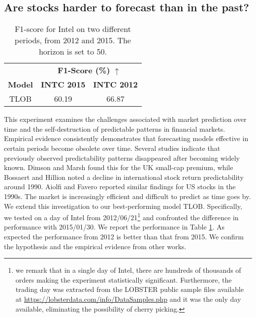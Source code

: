 \subsection{Are stocks harder to forecast than in the past?}
\begin{table}[h!]
\centering
\begin{minipage}{0.48\textwidth}
\centering
\caption{F1-score for Intel on two different periods, from 2012 and 2015. The horizon is set to 50.} 
\label{tab:intel2}
\centering
        \begin{tabular}{c|cc}
            \toprule
            & \multicolumn{2}{c}{\textbf{F1-Score (\%) }$\uparrow$} \\
            \cmidrule(lr){2-3} 
            \textbf{Model} & \textbf{INTC 2015} & \textbf{INTC 2012} \\
            \midrule
            TLOB & 60.19 & 66.87 \\
            \bottomrule
        \end{tabular}
        \end{minipage}
\end{table}
\label{sec:past}
This experiment examines the challenges associated with market prediction over time and the self-destruction of predictable patterns in financial markets. Empirical evidence consistently demonstrates that forecasting models effective in certain periods become obsolete over time. Several studies indicate that previously observed predictability patterns disappeared after becoming widely known. Dimson and Marsh \cite{dimson1999murphy} found this for the UK small-cap premium, while Bossaert and Hillion \cite{bossaerts1999implementing} noted a decline in international stock return predictability around 1990. Aiolfi and Favero \cite{aiolfi2005model} reported similar findings for US stocks in the 1990s. The market is increasingly efficient and difficult to predict as time goes by. We extend this investigation to our best-performing model TLOB. Specifically, we tested on a day of Intel from 2012/06/21\footnote{we remark that in a single day of Intel, there are hundreds of thousands of orders making the experiment statistically significant. Furthermore, the trading day was extracted from the LOBSTER public sample files available at \url{https://lobsterdata.com/info/DataSamples.php} and it was the only day available, eliminating the possibility of cherry picking.} and confronted the difference in performance with  2015/01/30. We report the performance in Table \ref{tab:intel2}. As expected the performance from 2012 is better than that from 2015. We confirm the hypothesis and the empirical evidence from other works.

